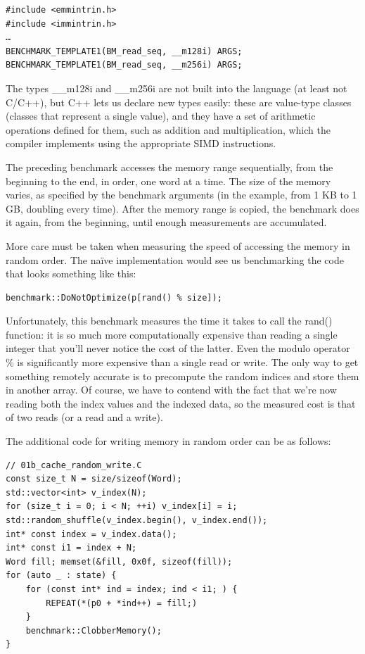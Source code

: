 \begin{lstlisting}[style=styleCXX]
#include <emmintrin.h>
#include <immintrin.h>
…
BENCHMARK_TEMPLATE1(BM_read_seq, __m128i) ARGS;
BENCHMARK_TEMPLATE1(BM_read_seq, __m256i) ARGS;
\end{lstlisting}

The types \_\_m128i and \_\_m256i are not built into the language (at least not C/C++), but C++ lets us declare new types easily: these are value-type classes (classes that represent a single value), and they have a set of arithmetic operations defined for them, such as addition and multiplication, which the compiler implements using the appropriate SIMD instructions.

The preceding benchmark accesses the memory range sequentially, from the beginning to the end, in order, one word at a time. The size of the memory varies, as specified by the benchmark arguments (in the example, from 1 KB to 1 GB, doubling every time). After the memory range is copied, the benchmark does it again, from the beginning, until enough measurements are accumulated.

More care must be taken when measuring the speed of accessing the memory in random order. The naïve implementation would see us benchmarking the code that looks something like this:

\begin{lstlisting}[style=styleCXX]
benchmark::DoNotOptimize(p[rand() % size]);
\end{lstlisting}

Unfortunately, this benchmark measures the time it takes to call the rand() function: it is so much more computationally expensive than reading a single integer that you'll never notice the cost of the latter. Even the modulo operator \% is significantly more expensive than a single read or write. The only way to get something remotely accurate is to precompute the random indices and store them in another array. Of course, we have to contend with the fact that we're now reading both the index values and the indexed data, so the measured cost is that of two reads (or a read and a write).

The additional code for writing memory in random order can be as follows:

\begin{lstlisting}[style=styleCXX]
// 01b_cache_random_write.C
const size_t N = size/sizeof(Word);
std::vector<int> v_index(N);
for (size_t i = 0; i < N; ++i) v_index[i] = i;
std::random_shuffle(v_index.begin(), v_index.end());
int* const index = v_index.data();
int* const i1 = index + N;
Word fill; memset(&fill, 0x0f, sizeof(fill));
for (auto _ : state) {
	for (const int* ind = index; ind < i1; ) {
		REPEAT(*(p0 + *ind++) = fill;)
	}
	benchmark::ClobberMemory();
}
\end{lstlisting}

